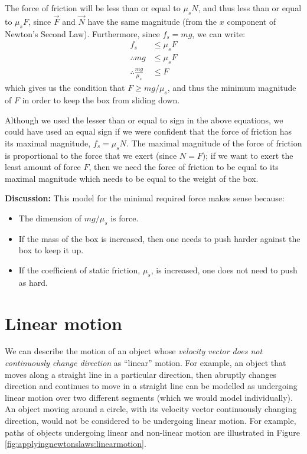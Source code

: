 \begin{example}
The force of friction will be less than or equal to $\mu_sN$, and thus less than or equal to $\mu_s F$, since $\vec F$ and $\vec N$ have the same magnitude (from the $x$ component of Newton's Second Law). Furthermore, since $f_s=mg$, we can write:
\begin{align*}
f_s &\leq \mu_s F\\
\therefore mg &\leq \mu_s F\\
\therefore \frac{mg}{\mu_s} &\leq F
\end{align*}
which gives us the condition that $F\geq mg/\mu_s$, and thus the minimum magnitude of $F$ in order to keep the box from sliding down.

Although we used the lesser than or equal to sign in the above equations, we could have used an equal sign if we were confident that the force of friction has its maximal magnitude, $f_s=\mu_sN$. The maximal magnitude of the force of friction is proportional to the force that we exert (since $N=F$); if we want to exert the least amount of force $F$, then we need the force of friction to be equal to its maximal magnitude which needs to be equal to the weight of the box. 

\textbf{Discussion:} This model for the minimal required force makes sense because:
\begin{itemize}
\item The dimension of $mg/\mu_s$ is force.
\item If the mass of the box is increased, then one needs to push harder against the box to keep it up.
\item If the coefficient of static friction, $\mu_s$, is increased, one does not need to push as hard. 
\end{itemize}
\end{example}

\section{Linear motion}
We can describe the motion of an object whose \textit{velocity vector does not continuously change direction} as ``linear'' motion. For example, an object that moves along a straight line in a particular direction, then abruptly changes direction and continues to move in a straight line can be modelled as undergoing linear motion over two different segments (which we would model individually). An object moving around a circle, with its velocity vector continuously changing direction, would not be considered to be undergoing linear motion. For example, paths of objects undergoing linear and non-linear motion are illustrated in Figure \ref{fig:applyingnewtonslaws:linearmotion}.

